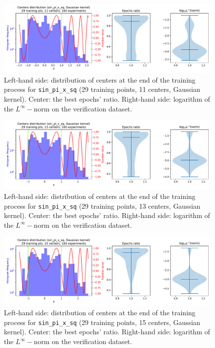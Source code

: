 \documentclass[12pt]{report} %
\begin{document}
\begin{figure}[ht]
  \centering
  \includegraphics[width=\textwidth]
  {imagenes/experiments/1d/sin_pi_x_sq_statistic_interpolation/tr29_c11_sin_pi_x_sq_gaussian_kernel.pdf}
  \caption{Left-hand side: distribution of centers at the end of the training process for
    \texttt{sin\_pi\_x\_sq} (29 training points, 11 centers, Gaussian kernel). Center: the best epochs' ratio.
    Right-hand side: logarithm of the $L^\infty-$norm on the verification dataset.}
  \label{fig:sin-pi-x-sq-statistic-tr29-c11}
\end{figure}

\begin{figure}[ht]
  \centering
  \includegraphics[width=\textwidth]
  {imagenes/experiments/1d/sin_pi_x_sq_statistic_interpolation/tr29_c13_sin_pi_x_sq_gaussian_kernel.pdf}
  \caption{Left-hand side: distribution of centers at the end of the training process for
    \texttt{sin\_pi\_x\_sq} (29 training points, 13 centers, Gaussian kernel). Center: the best epochs' ratio.
    Right-hand side: logarithm of the $L^\infty-$norm on the verification dataset.}
  \label{fig:sin-pi-x-sq-statistic-tr29-c13}
\end{figure}

\begin{figure}[ht]
  \centering
  \includegraphics[width=\textwidth]
  {imagenes/experiments/1d/sin_pi_x_sq_statistic_interpolation/tr29_c15_sin_pi_x_sq_gaussian_kernel.pdf}
  \caption{Left-hand side: distribution of centers at the end of the training process for
    \texttt{sin\_pi\_x\_sq} (29 training points, 15 centers, Gaussian kernel). Center: the best epochs' ratio.
    Right-hand side: logarithm of the $L^\infty-$norm on the verification dataset.}
  \label{fig:sin-pi-x-sq-statistic-tr29-c15}
\end{figure}
\end{document}
